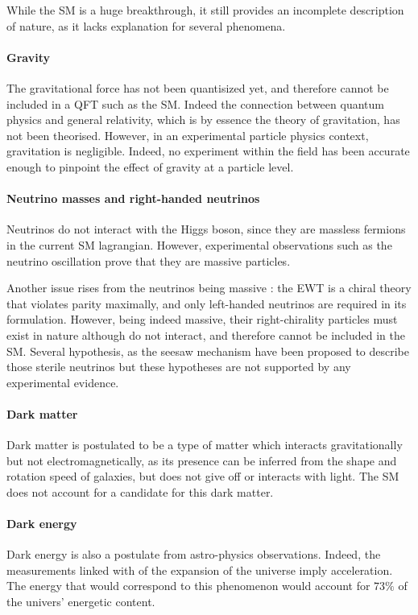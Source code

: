 While the SM is a huge breakthrough, it still provides an incomplete description of nature, as it lacks explanation for several phenomena. 

\paragraph{Gravity} The gravitational force has not been quantisized yet, and therefore cannot be included in a QFT such as the SM. Indeed the connection between quantum physics and general relativity, which is by essence the theory of gravitation, has not been theorised. However, in an experimental particle physics context, gravitation is negligible. Indeed, no experiment within the field has been accurate enough to pinpoint the effect of gravity at a particle level.

\paragraph{Neutrino masses and right-handed neutrinos} Neutrinos do not interact with the Higgs boson, since they are massless fermions in the current SM lagrangian. However, experimental observations such as the neutrino oscillation \cite{PhysRevLett.81.1562,PhysRevLett.89.011301} prove that they are massive particles.

Another issue rises from the neutrinos being massive : the EWT is a chiral theory that violates parity maximally, and only left-handed neutrinos are required in its formulation. However, being indeed massive, their right-chirality particles must exist in nature although do not interact, and therefore cannot be included in the SM. Several hypothesis, as the seesaw mechanism \cite{PhysRevD.22.2227,PhysRevLett.60.1813,PhysRevD.23.165,PhysRevLett.44.912,GellMann:1980vs,MINKOWSKI1977421} have been proposed to describe those sterile neutrinos but these hypotheses are not supported by any experimental evidence.

\paragraph{Dark matter} Dark matter is postulated to be a type of matter which interacts gravitationally but not electromagnetically, as its presence can be inferred from the shape and rotation speed of galaxies, but does not give off or interacts with light. The SM does not account for a candidate for this dark matter.

\paragraph{Dark energy} Dark energy is also a postulate from astro-physics observations. Indeed, the measurements linked with of the expansion of the universe imply acceleration. The energy that would correspond to this phenomenon would account for $73\%$ of the univers' energetic content. 


